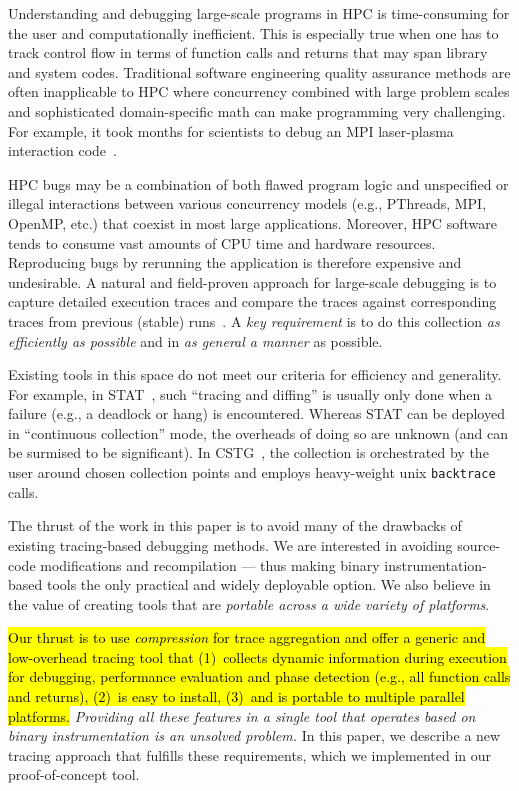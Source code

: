 Understanding and debugging large-scale programs in HPC 
is time-consuming for the user and computationally inefficient.
%
This is especially true when one has to 
track control flow in terms of function calls and returns that may
span library and system codes. 
%
Traditional software engineering quality assurance methods are 
often inapplicable to HPC where concurrency combined with 
large problem scales and sophisticated domain-specific math can make programming 
very challenging. 
%
For example, it took months for scientists to debug an MPI laser-plasma interaction 
code~\cite{hpcdoe}.


HPC bugs may be a combination of both flawed program logic and unspecified or illegal interactions between various concurrency models (e.g., PThreads, MPI, OpenMP, etc.) that coexist in most large applications. Moreover, HPC software tends to consume vast amounts of CPU time and hardware resources. Reproducing bugs by rerunning the application is therefore expensive and undesirable. 
A natural and field-proven approach for large-scale debugging is to capture detailed execution traces and compare the traces against corresponding traces from previous (stable) runs~\cite{stat,cstg}.
%
A {\em key requirement} is to do this collection {\em as efficiently as possible}
and in {\em as general a manner} as possible.
%

Existing tools in this space
do not meet our criteria for efficiency and generality.
%
For example, in STAT~\cite{stat}, such ``tracing and diffing'' is usually only done
when a failure (e.g., a deadlock or hang) is encountered.
%
Whereas STAT can be deployed in ``continuous collection'' mode, the overheads of
doing so are unknown (and can be surmised to be significant).
%
In CSTG~\cite{cstg}, the collection is orchestrated by the
user around chosen collection points and employs heavy-weight
unix {\tt backtrace} calls.


The thrust of the work in this paper is to avoid many of the drawbacks of existing
tracing-based debugging methods.
%
We are interested in avoiding
source-code modifications and recompilation --- thus making binary
instrumentation-based tools the only practical and widely deployable option.
%
We also believe in the value
of creating tools that are {\em portable across a 
wide variety of platforms}.
%

%
\hl{Our thrust is to use \textit{compression} for trace aggregation and offer 
a generic and low-overhead tracing tool that 
(1)~collects dynamic information during execution for debugging, performance evaluation and phase detection (e.g., all function
calls and returns), 
(2)~is easy to install, 
(3)~and is portable to multiple parallel platforms.
}
%
{\em Providing all these features in a single tool
that operates based on binary instrumentation
is an unsolved problem.}
%
In this paper, we describe a new tracing approach that fulfills these requirements, which we implemented in our proof-of-concept \parlot tool.



